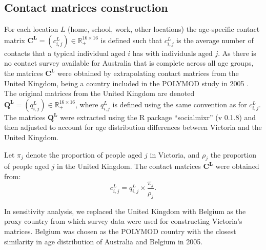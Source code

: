 \subsection{Contact matrices construction}
\label{matrix_construction}
For each location $L$ (home, school, work, other locations) the age-specific contact matrix $\mathbf{C^L} = (c_{i,j}^L) \in \mathbb{R}_{+}^{16 \times 16}$ is defined such that $c_{i,j}^L$ is the average number of contacts that a typical individual aged $i$ has with individuals aged $j$. As there is no contact survey available for Australia that is complete across all age groups, the matrices $\mathbf{C^L}$ were obtained by extrapolating contact matrices from the United Kingdom, being a country included in the POLYMOD study in 2005 \cite{RN141}. The original matrices from the United Kingdom are denoted $\mathbf{Q^L} = (q_{i,j}^L) \in \mathbb{R}_{+}^{16 \times 16}$, where $q_{i,j}^L$ is defined using the same convention as for $c_{i,j}^L$. The matrices $\mathbf{Q^L}$ were extracted using the R package ``socialmixr'' (v 0.1.8) and then adjusted to account for age distribution differences between Victoria and the United Kingdom.

Let $\pi_j$ denote the proportion of people aged $j$ in Victoria, and $\rho_j$ the proportion of people aged $j$ in the United Kingdom. The contact matrices $\mathbf{C^L}$ were obtained from:
$$
c_{i,j}^L = q_{i,j}^L \times \frac{\pi_j}{\rho_j} . 
$$

In sensitivity analysis, we replaced the United Kingdom with Belgium as the proxy country from which survey data were used for constructing Victoria's matrices. Belgium was chosen as the POLYMOD country with the closest similarity in age distribution of Australia and Belgium in 2005.
